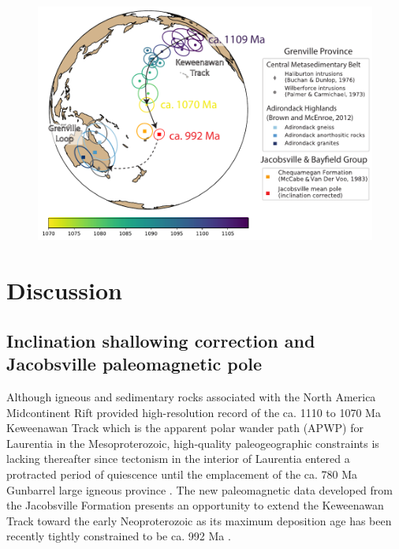 \documentclass[draft]{agujournal2019}
\begin{document}
\begin{figure}[h!]
\centering
\includegraphics[width=\textwidth]{Jacobsville_pole_plot.pdf}
\caption{}
\label{fig:pole_plot}
\end{figure}



\section*{Discussion}
\subsection*{Inclination shallowing correction and Jacobsville paleomagnetic pole}

Although igneous and sedimentary rocks associated with the North America Midcontinent Rift provided high-resolution record of the ca. 1110 to 1070 Ma Keweenawan Track which is the apparent polar wander path (APWP) for Laurentia in the Mesoproterozoic, high-quality paleogeographic constraints is lacking thereafter since tectonism in the interior of Laurentia entered a protracted period of quiescence until the emplacement of the ca. 780 Ma Gunbarrel large igneous province \cite{Harlan2003a}. The new paleomagnetic data developed from the Jacobsville Formation presents an opportunity to extend the Keweenawan Track toward the early Neoproterozoic as its maximum deposition age has been recently tightly constrained to be ca. 992 Ma \cite{Hodgin2022a}. 
\end{document}
